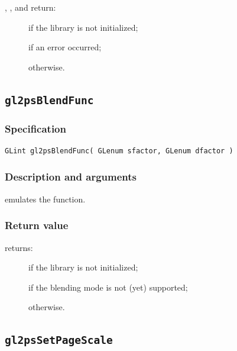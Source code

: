 \noindent{}, , 
and  return:
\begin{description}
\item[] if the library is not initialized;
\item[] if an error occurred;
\item[] otherwise.
\end{description}



\subsection{\texttt{gl2psBlendFunc}}
\label{sec:gl2psBlendFunc}

\subsubsection{Specification}

\begin{verbatim}
GLint gl2psBlendFunc( GLenum sfactor, GLenum dfactor )
\end{verbatim}

\subsubsection{Description and arguments}

 emulates the  function.

\subsubsection{Return value}

\noindent{} returns:
\begin{description}
\item[] if the library is not initialized;
\item[] if the blending mode is not (yet) supported;
\item[] otherwise.
\end{description}


\subsection{\texttt{gl2psSetPageScale}}
\label{sec:gl2psSetPageScale}

